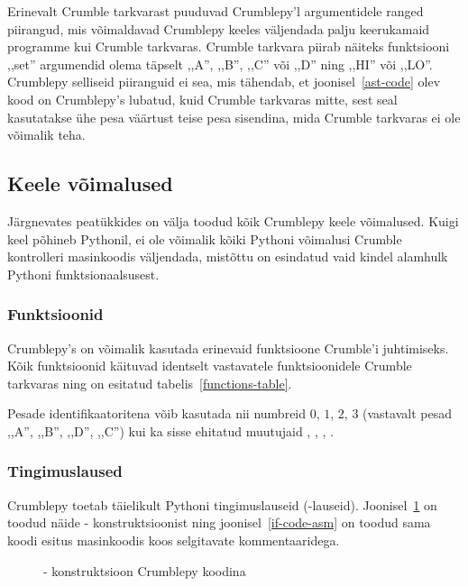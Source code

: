 \documentclass[12pt]{article}
\begin{document}
Erinevalt Crumble tarkvarast puuduvad Crumblepy'l argumentidele ranged piirangud, mis võimaldavad Crumblepy keeles väljendada palju keerukamaid programme kui Crumble tarkvaras. Crumble tarkvara piirab näiteks funktsiooni ,,set'' argumendid olema täpselt ,,A'', ,,B'', ,,C'' või ,,D'' ning ,,HI'' või ,,LO''. Crumblepy selliseid piiranguid ei sea, mis tähendab, et joonisel~\ref{ast-code} olev kood on Crumblepy's lubatud, kuid Crumble tarkvaras mitte, sest seal kasutatakse ühe pesa väärtust teise pesa sisendina, mida Crumble tarkvaras ei ole võimalik teha.

\subsection{Keele võimalused} \label{keele-võimalused}
Järgnevates peatükkides on välja toodud kõik Crumblepy keele võimalused. Kuigi keel põhineb Pythonil, ei ole võimalik kõiki Pythoni võimalusi Crumble kontrolleri masinkoodis väljendada, mistõttu on esindatud vaid kindel alamhulk Pythoni funktsionaalsusest.

\subsubsection{Funktsioonid}
Crumblepy's on võimalik kasutada erinevaid funktsioone Crumble'i juhtimiseks. Kõik funktsioonid käituvad identselt vastavatele funktsioonidele Crumble tarkvaras ning on esitatud tabelis~\ref{functions-table}.


Pesade identifikaatoritena võib kasutada nii numbreid $0$, $1$, $2$, $3$ (vastavalt pesad ,,A'', ,,B'', ,,D'', ,,C'') kui ka sisse ehitatud muutujaid , , , .

\subsubsection{Tingimuslaused}
Crumblepy toetab täielikult Pythoni tingimuslauseid (-lauseid). Joonisel~\ref{if-code} on toodud näide - konstruktsioonist ning joonisel~\ref{if-code-asm} on toodud sama koodi esitus masinkoodis koos selgitavate kommentaaridega.

\begin{figure}[!ht]
	\caption{- konstruktsioon Crumblepy koodina}
	\label{if-code}
\end{figure}
\end{document}
